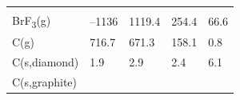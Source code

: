 \documentclass[
  9pt,
]{extbook}
\theoremstyle{definition}
\theoremstyle{definition}
\theoremstyle{definition}
\theoremstyle{remark}
\begin{document}
\begin{longtable}[]{@{}lllll@{}}
\begin{minipage}[t]{0.18\columnwidth}
\end{minipage}\tabularnewline
\begin{minipage}[t]{0.10\columnwidth}\raggedright
BrF\textsubscript{3}(g)\strut
\end{minipage} & \begin{minipage}[t]{0.19\columnwidth}\raggedright
--1136\strut
\end{minipage} & \begin{minipage}[t]{0.20\columnwidth}\raggedright
1119.4\strut
\end{minipage} & \begin{minipage}[t]{0.18\columnwidth}\raggedright
254.4\strut
\end{minipage} & \begin{minipage}[t]{0.18\columnwidth}\raggedright
66.6\strut
\end{minipage}\tabularnewline
\begin{minipage}[t]{0.10\columnwidth}\raggedright
C(g)\strut
\end{minipage} & \begin{minipage}[t]{0.19\columnwidth}\raggedright
716.7\strut
\end{minipage} & \begin{minipage}[t]{0.20\columnwidth}\raggedright
671.3\strut
\end{minipage} & \begin{minipage}[t]{0.18\columnwidth}\raggedright
158.1\strut
\end{minipage} & \begin{minipage}[t]{0.18\columnwidth}\raggedright
0.8\strut
\end{minipage}\tabularnewline
\begin{minipage}[t]{0.10\columnwidth}\raggedright
C(s,diamond)\strut
\end{minipage} & \begin{minipage}[t]{0.19\columnwidth}\raggedright
1.9\strut
\end{minipage} & \begin{minipage}[t]{0.20\columnwidth}\raggedright
2.9\strut
\end{minipage} & \begin{minipage}[t]{0.18\columnwidth}\raggedright
2.4\strut
\end{minipage} & \begin{minipage}[t]{0.18\columnwidth}\raggedright
6.1\strut
\end{minipage}\tabularnewline
\begin{minipage}[t]{0.10\columnwidth}\raggedright
C(s,graphite)\strut

\end{minipage}
\end{longtable}
\end{document}
